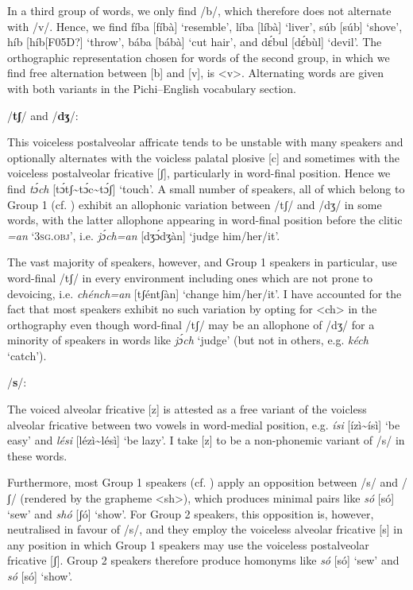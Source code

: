 In a third group of words, we only find /b/, which therefore does not alternate with /v/. Hence, we find fíba [fíbà] ‘resemble’, líba [líbà] ‘liver’, súb [súb] ‘shove’, híb [híb[F05D?] ‘throw’, bába [bábà] ‘cut hair’, and dɛ́bul [dɛ́bùl] ‘devil’. The orthographic representation chosen for words of the second group, in which we find free alternation between [b] and [v], is <v>. Alternating words are given with both variants in the Pichi–English vocabulary section.


/\textbf{tʃ}/ and /\textbf{dʒ}/:

This voiceless postalveolar affricate tends to be unstable with many speakers and optionally alternates with the voicless palatal plosive [c] and sometimes with the voiceless postalveolar fricative [ʃ], particularly in word-final position. Hence we find \textit{tɔ́ch} [tɔ́tʃ{\textasciitilde}tɔ́c{\textasciitilde}tɔ́ʃ] ‘touch’. A small number of speakers, all of which belong to Group 1 (cf. ) exhibit an allophonic variation between /tʃ/ and /dʒ/ in some words, with the latter allophone appearing in word-final position before the clitic \textit{=an} ‘\textsc{3sg.obj}’, i.e. \textit{jɔ́ch=an} [dʒɔ́dʒàn] ‘judge him/her/it’. 


The vast majority of speakers, however, and Group 1 speakers in particular, use word-final /tʃ/ in every environment including ones which are not prone to devoicing, i.e. \textit{chénch=an} [tʃéntʃàn] ‘change him/her/it’. I have accounted for the fact that most speakers exhibit no such variation by opting for <ch> in the orthography even though word-final /tʃ/ may be an allophone of /dʒ/ for a minority of speakers in words like \textit{jɔ́ch} ‘judge’ (but not in others, e.g. \textit{kéch} ‘catch’).


/\textbf{s}/:

The voiced alveolar fricative [z] is attested as a free variant of the voicless alveolar fricative between two vowels in word-medial position, e.g. \textit{ísi} [ízì{\textasciitilde}ísì] ‘be easy’ and \textit{lési} [lézì{\textasciitilde}lésì] ‘be lazy’. I take [z] to be a non-phonemic variant of /s/ in these words. 


Furthermore, most Group 1 speakers (cf. ) apply an opposition between /s/ and /ʃ/ (rendered by the grapheme <sh>), which produces minimal pairs like \textit{só} [só] ‘sew’ and \textit{shó} [ʃó] ‘show’. For Group 2 speakers, this opposition is, however, neutralised in favour of /s/, and they employ the voiceless alveolar fricative [s] in any position in which Group 1 speakers may use the voiceless postalveolar fricative [ʃ]. Group 2 speakers therefore produce homonyms like \textit{só} [só] ‘sew’ and \textit{só} [só] ‘show’.



